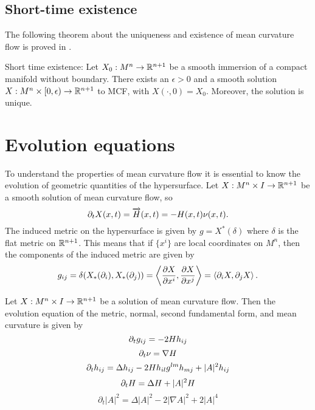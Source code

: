 \subsection{Short-time existence}
The following theorem about the uniqueness and existence of mean curvature flow is proved in \cite{andrews2022extrinsic}. 
\begin{thm}
    Short time existence: Let $ X_{0}: M^{n} \to \mathbb{R}^{n+1} $ be a smooth immersion of a compact manifold without boundary. There exists an $ \epsilon >0 $ and a smooth solution $ X : M^{n} \times [0, \epsilon) \to \mathbb{R}^{n+1}$ to MCF, with $ X( \cdot, 0) = X_{0} $. Moreover, the solution is unique.
\end{thm}

\section{Evolution equations}
To understand the properties of mean curvature flow it is essential to know the evolution of geometric quantities of the hypersurface. Let $X : M^n \times I \to \mathbb{R}^{n+1}$ be a smooth solution of mean curvature flow, so 
\[ \partial_t X(x,t) = \overrightarrow{H}(x,t)  = -H(x,t)\nu(x,t).\]
The induced metric on the hypersurface is given by $g = X^*(\delta)$ where $\delta$ is the flat metric on $\mathbb{R}^{n+1}$. This means that if $\{x^i\}$ are local coordinates on $M^n$, then the components of the induced metric are given by
\[ g_{ij} = \delta(X_*(\partial_i),X_*(\partial_j)) = \left\langle  \frac{\partial X}{\partial x^i}, \frac{\partial X}{\partial x^j} \right\rangle = \left< \partial_{i}X, \partial_{j} X\right>.  \]
\begin{lemma}\label{evolutioneq}
     Let $X: M^n \times I \to \mathbb{R}^{n+1}$ be a solution of mean curvature flow. Then the evolution equation of the metric, normal, second fundamental form, and mean curvature is given by
\begin{equation}
    \partial_t g_{ij} = -2Hh_{ij}
\end{equation}
\begin{equation}
\partial_t \nu  = \nabla H
\end{equation}
\begin{equation}
\partial_t h_{ij} = \Delta h_{ij} - 2Hh_{il}g^{lm}h_{mj}+|A|^2h_{ij}
\end{equation}
\begin{equation}
    \partial_t H = \Delta H + |A|^2H \label{dtH}
\end{equation}
\begin{equation}
    \partial_{t}|A|^{2} = \Delta |A|^{2}-2|\nabla A|^{2} + 2|A|^{4}
\end{equation}
\end{lemma}
